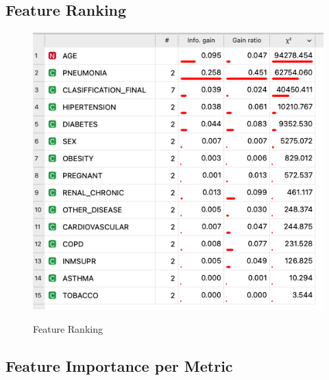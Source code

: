 \subsection{Feature Ranking}
\begin{figure}[H]%
    \caption{Feature Ranking}%
    \label{fig:feat_full_rank}%
    \centering
    {\includegraphics[width=\textwidth]{img/appendix/feat_rank.png} }
\end{figure}

\subsection{Feature Importance per Metric}

